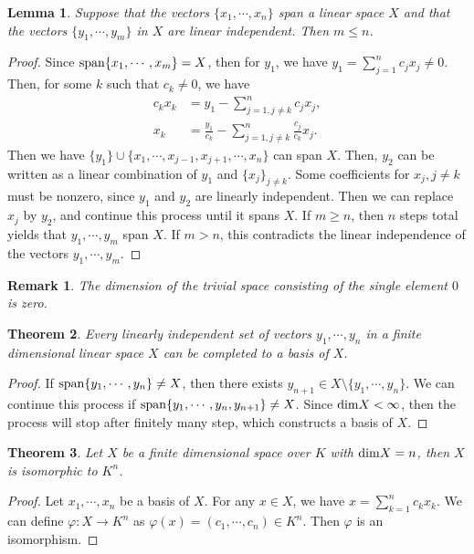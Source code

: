 \documentclass[10pt]{book}
\newtheorem{theorem}{Theorem}[chapter]
\newtheorem{lemma}[theorem]{Lemma}
\newtheorem{remark}{Remark}[chapter]
\theoremstyle{definition}
\numberwithin{equation}{chapter}
\begin{document}
\medskip

\begin{lemma}
Suppose that the vectors $\{x_1,\cdots,x_n\}$ span a linear space $X$ and that
the vectors $\{y_1,\cdots,y_m\}$ in $X$ are linear independent. Then $m \leq n$.
\end{lemma}
\begin{proof}
Since ${\rm span}\{x_1,\cdots,x_m\} = X$, then for $y_1$, we have $y_1 = \sum^n_{j=1}c_j x_j \neq 0$. Then, for some $k$ such that $c_k\neq 0$, we have
\begin{align*}
    c_k x_k & = y_1 - \sum^n_{j=1, j\neq k} c_j x_j, \\
    x_k & = \frac{y_1}{c_k} - \sum^n_{j=1, j\neq k} \frac{c_j}{c_k} x_j.
\end{align*}
Then we have $\{y_1\}\cup\{x_1,\cdots,x_{j-1},x_{j+1},\cdots, x_n\}$ can span $X$. Then, $y_2$ can be written as a linear combination of $y_1$ and $\{x_j\}_{j\neq k}$. Some coefficients for $x_j, j\neq k$ must be nonzero, since $y_1$ and $y_2$ are linearly independent. Then we can replace $x_j$ by $y_2$, and continue this process until it spans $X$. If $m \geq n$, then $n$ steps total yields that $y_1,\cdots,y_m$ span $X$. If $m > n$, this contradicts the linear independence of the vectors $y_1,\cdots,y_m$.
\end{proof}

\begin{remark}
The dimension of the trivial space consisting of the single element $0$ is zero.
\end{remark}

\medskip

\begin{theorem}
Every linearly independent set of vectors $y_1,\cdots,y_n$ in a finite dimensional linear space $X$ can be completed to a basis of $X$.
\end{theorem}
\begin{proof}
If ${\rm span}\{y_1,\cdots,y_n\} \neq X$, then there exists $y_{n+1}\in X \setminus \{y_1,\cdots,y_n\}$. We can continue this process if ${\rm span}\{y_1,\cdots,y_n, y_{n+1}\}\neq X$. Since ${\rm dim}X < \infty$, then the process will stop after finitely many step, which  constructs a basis of $X$.
\end{proof}

\medskip

\begin{theorem}
Let $X$ be a finite dimensional space over $K$ with ${\rm dim}X = n$, then $X$ is isomorphic to $K^n$.
\end{theorem}
\begin{proof}
Let $x_1, \cdots, x_n$ be a basis of $X$. For any $x\in X$, we have $x = \sum^n_{k=1}c_k x_k$. We can define $\varphi: X\to K^n$ as $\varphi(x) = (c_1, \cdots, c_n) \in K^n$. Then $\varphi$ is an isomorphism.
\end{proof}
\end{document}
